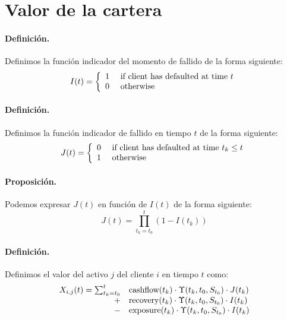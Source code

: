 \section{Valor de la cartera}

\paragraph{Definici\'on.} Definimos la funci\'on indicador del momento de 
fallido de la forma siguiente:
\begin{displaymath}
I(t) = \left\{
\begin{array}{ll}
1 & \textrm{ if client has defaulted at time } t \cr
0 & \textrm{ otherwise}
\end{array}
\right.
\end{displaymath}

\paragraph{Definici\'on.} Definimos la funci\'on indicador de fallido en 
tiempo $t$ de la forma siguiente:
\begin{displaymath}
J(t) = \left\{
\begin{array}{ll}
0 & \textrm{ if client has defaulted at time } t_k \leq t\cr
1 & \textrm{ otherwise}
\end{array}
\right.
\end{displaymath}

\paragraph{Proposici\'on.} Podemos expresar $J(t)$ en funci\'on de $I(t)$ de la
forma siguiente:
\begin{displaymath}
J(t) = \prod_{t_k=t_0}^{t} (1-I(t_k))
\end{displaymath}

\paragraph{Definici\'on.} Definimos el valor del activo $j$ del cliente $i$ en 
tiempo $t$ como:
\begin{displaymath}
\begin{array}{rl}
X_{i,j}(t) = \sum_{t_k=t_0}^{t} & \textrm{cashflow}(t_k) \cdot \Upsilon(t_k,t_0, S_{t_0}) \cdot J(t_k) \cr
+ &\textrm{recovery}(t_k) \cdot \Upsilon(t_k,t_0, S_{t_0}) \cdot I(t_k) \cr
- &\textrm{exposure}(t_k) \cdot \Upsilon(t_k,t_0, S_{t_0}) \cdot I(t_k)  
\end{array}
\end{displaymath}

